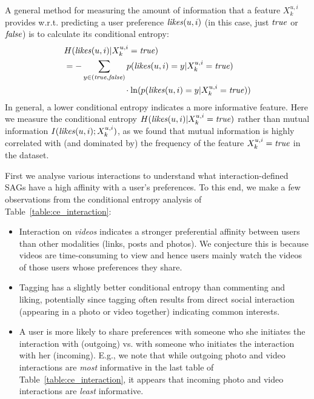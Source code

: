 A general method for measuring the amount of information that a 
feature $X^{u,i}_k$ provides w.r.t. predicting a user preference $\likes(u,i)$ (in this
case, just $\true$ or $\false$) is to calculate its conditional entropy:
{\small \begin{align*}
&H(\likes(u,i) | X^{u,i}_k=\true)\\
& = -\sum_{y\in{(\true,\false)}} p(\likes(u,i)=y|X^{u,i}_k=\true) \\
& \qquad \qquad \qquad \;\;\;\; \cdot \ln( p(\likes(u,i)=y|X^{u,i}_k=\true))
\end{align*}}
In general, a lower conditional entropy indicates a more informative
feature. Here we measure the conditional entropy $H(\likes(u,i)| X^{u,i}_k=\true)$
rather than mutual information $I(\likes(u,i); X^{u,i}_k)$, as we found 
that mutual information is highly correlated with (and dominated by) the 
frequency of the feature $X^{u,i}_k=\true$ in the dataset.

First we analyse various interactions to understand what
interaction-defined SAGs have a high affinity with a user's 
preferences.  To this end, we make a few observations from the
conditional entropy analysis of Table~\ref{table:ce_interaction}:
\begin{itemize}
\item Interaction on {\em videos} indicates a stronger preferential
  affinity between users than other modalities (links, posts
  and photos).  We conjecture this is because videos are 
  time-consuming to view and hence users mainly watch the videos of those
  users whose preferences they share.
\item Tagging has a slightly better conditional entropy than
  commenting and liking, potentially since tagging 
  often results from direct social interaction (appearing in a photo
  or video together) indicating common interests.
\item A user is more likely to share preferences with someone who she
  initiates the interaction with (outgoing) vs. with someone who
  initiates the interaction with her (incoming).  E.g., we note that
  while outgoing photo and video interactions are \emph{most}
  informative in the last table of Table~\ref{table:ce_interaction},
  it appears that incoming photo and video interactions are
  \emph{least} informative.
\end{itemize}


